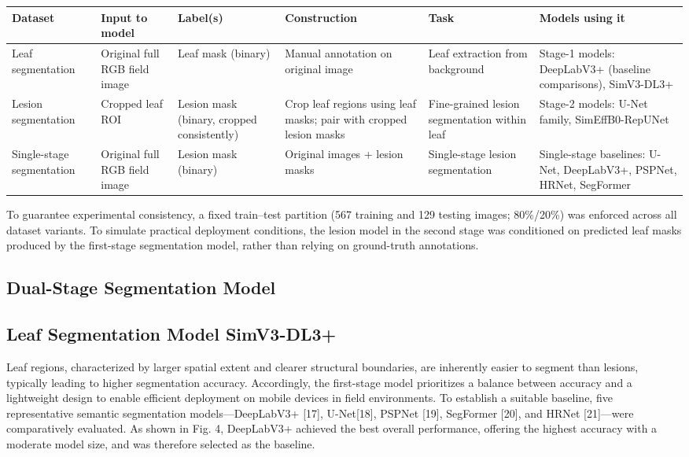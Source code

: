 \documentclass[
]{article}
\begin{document}
\begin{longtable}[]{@{}llllll@{}}
\toprule
Dataset & Input to model & Label(s) & Construction & Task & Models using
it \\
\midrule
\endhead
Leaf segmentation & Original full RGB field image & Leaf mask (binary) &
Manual annotation on original image & Leaf extraction from background &
Stage-1 models: DeepLabV3+ (baseline comparisons), SimV3-DL3+ \\
Lesion segmentation & Cropped leaf ROI & Lesion mask (binary, cropped
consistently) & Crop leaf regions using leaf masks; pair with cropped
lesion masks & Fine-grained lesion segmentation within leaf & Stage-2
models: U-Net family, SimEffB0-RepUNet \\
Single-stage segmentation & Original full RGB field image & Lesion mask
(binary) & Original images + lesion masks & Single-stage lesion
segmentation & Single-stage baselines: U-Net, DeepLabV3+, PSPNet, HRNet,
SegFormer \\
\bottomrule
\end{longtable}

To guarantee experimental consistency, a fixed train--test partition
(567 training and 129 testing images; 80\%/20\%) was enforced across all
dataset variants. To simulate practical deployment conditions, the
lesion model in the second stage was conditioned on predicted leaf masks
produced by the first-stage segmentation model, rather than relying on
ground-truth annotations.

\hypertarget{dual-stage-segmentation-model}{%
\subsection{Dual-Stage Segmentation
Model}\label{dual-stage-segmentation-model}}

\hypertarget{leaf-segmentation-model-simv3-dl3}{%
\subsection{Leaf Segmentation Model
SimV3-DL3+}\label{leaf-segmentation-model-simv3-dl3}}

Leaf regions, characterized by larger spatial extent and clearer
structural boundaries, are inherently easier to segment than lesions,
typically leading to higher segmentation accuracy. Accordingly, the
first-stage model prioritizes a balance between accuracy and a
lightweight design to enable efficient deployment on mobile devices in
field environments. To establish a suitable baseline, five
representative semantic segmentation models---DeepLabV3+ {[}17{]},
U-Net{[}18{]}, PSPNet {[}19{]}, SegFormer {[}20{]}, and HRNet
{[}21{]}---were comparatively evaluated. As shown in Fig. 4, DeepLabV3+
achieved the best overall performance, offering the highest accuracy
with a moderate model size, and was therefore selected as the baseline.
\end{document}
